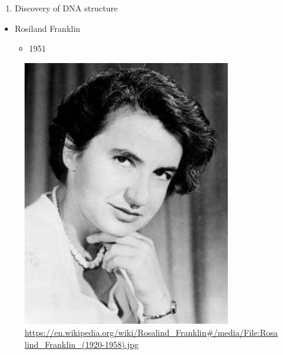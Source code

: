 \documentclass[
]{book}
\providecommand{\tightlist}{%
  \setlength{\itemsep}{0pt}\setlength{\parskip}{0pt}}
\begin{document}
\begin{enumerate}
\def\labelenumi{\arabic{enumi}.}
\setcounter{enumi}{2}
\tightlist
\item
  Discovery of DNA structure
\end{enumerate}

\begin{itemize}
\tightlist
\item
  Rosiland Franklin

  \begin{itemize}
  \tightlist
  \item
    1951
  \end{itemize}
\end{itemize}

\begin{figure}
\centering
\includegraphics[width=0.8\textwidth,height=\textheight]{./Figures/Rosalind1.png}
\caption{\url{https://en.wikipedia.org/wiki/Rosalind_Franklin\#/media/File:Rosalind_Franklin_(1920-1958).jpg}}
\end{figure}
\end{document}
